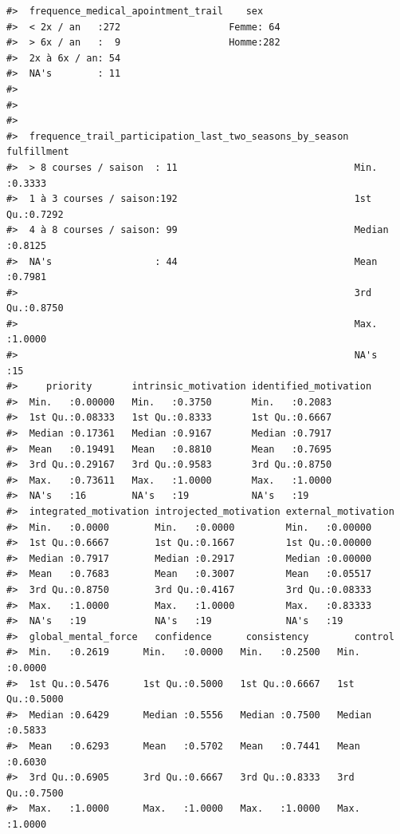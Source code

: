 \documentclass[
]{article}
\begin{document}
\begin{verbatim}
#>  frequence_medical_apointment_trail    sex     
#>  < 2x / an   :272                   Femme: 64  
#>  > 6x / an   :  9                   Homme:282  
#>  2x à 6x / an: 54                              
#>  NA's        : 11                              
#>                                                
#>                                                
#>                                                
#>  frequence_trail_participation_last_two_seasons_by_season  fulfillment    
#>  > 8 courses / saison  : 11                               Min.   :0.3333  
#>  1 à 3 courses / saison:192                               1st Qu.:0.7292  
#>  4 à 8 courses / saison: 99                               Median :0.8125  
#>  NA's                  : 44                               Mean   :0.7981  
#>                                                           3rd Qu.:0.8750  
#>                                                           Max.   :1.0000  
#>                                                           NA's   :15      
#>     priority       intrinsic_motivation identified_motivation
#>  Min.   :0.00000   Min.   :0.3750       Min.   :0.2083       
#>  1st Qu.:0.08333   1st Qu.:0.8333       1st Qu.:0.6667       
#>  Median :0.17361   Median :0.9167       Median :0.7917       
#>  Mean   :0.19491   Mean   :0.8810       Mean   :0.7695       
#>  3rd Qu.:0.29167   3rd Qu.:0.9583       3rd Qu.:0.8750       
#>  Max.   :0.73611   Max.   :1.0000       Max.   :1.0000       
#>  NA's   :16        NA's   :19           NA's   :19           
#>  integrated_motivation introjected_motivation external_motivation
#>  Min.   :0.0000        Min.   :0.0000         Min.   :0.00000    
#>  1st Qu.:0.6667        1st Qu.:0.1667         1st Qu.:0.00000    
#>  Median :0.7917        Median :0.2917         Median :0.00000    
#>  Mean   :0.7683        Mean   :0.3007         Mean   :0.05517    
#>  3rd Qu.:0.8750        3rd Qu.:0.4167         3rd Qu.:0.08333    
#>  Max.   :1.0000        Max.   :1.0000         Max.   :0.83333    
#>  NA's   :19            NA's   :19             NA's   :19         
#>  global_mental_force   confidence      consistency        control      
#>  Min.   :0.2619      Min.   :0.0000   Min.   :0.2500   Min.   :0.0000  
#>  1st Qu.:0.5476      1st Qu.:0.5000   1st Qu.:0.6667   1st Qu.:0.5000  
#>  Median :0.6429      Median :0.5556   Median :0.7500   Median :0.5833  
#>  Mean   :0.6293      Mean   :0.5702   Mean   :0.7441   Mean   :0.6030  
#>  3rd Qu.:0.6905      3rd Qu.:0.6667   3rd Qu.:0.8333   3rd Qu.:0.7500  
#>  Max.   :1.0000      Max.   :1.0000   Max.   :1.0000   Max.   :1.0000  

\end{verbatim}
\end{document}

